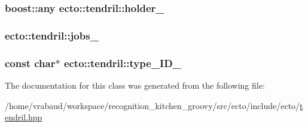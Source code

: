 \hypertarget{classecto_1_1tendril_a8bc7ae1c22c1af9765284666af02868b}{
\subsubsection[{holder\-\_\-}]{\setlength{\rightskip}{0pt plus 5cm}boost\-::any {\bf ecto\-::tendril\-::holder\-\_\-}}}\label{classecto_1_1tendril_a8bc7ae1c22c1af9765284666af02868b}
\hypertarget{classecto_1_1tendril_acf171c75c0ace5cd108e8355ee83199c}{
\subsubsection[{jobs\-\_\-}]{ {\bf ecto\-::tendril\-::jobs\-\_\-}}}\label{classecto_1_1tendril_acf171c75c0ace5cd108e8355ee83199c}
\hypertarget{classecto_1_1tendril_a5b237bfa0a9acefc48d577b77380058d}{
\subsubsection[{type\-\_\-\-I\-D\-\_\-}]{\setlength{\rightskip}{0pt plus 5cm}const char$\ast$ {\bf ecto\-::tendril\-::type\-\_\-\-I\-D\-\_\-}}}\label{classecto_1_1tendril_a5b237bfa0a9acefc48d577b77380058d}


\-The documentation for this class was generated from the following file\-:\begin{DoxyCompactItemize}
\item 
/home/vrabaud/workspace/recognition\-\_\-kitchen\-\_\-groovy/src/ecto/include/ecto/\hyperlink{tendril_8hpp}{tendril.\-hpp}\end{DoxyCompactItemize}
